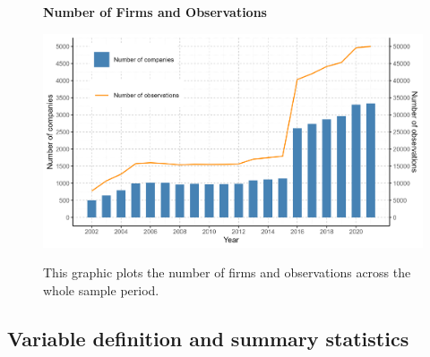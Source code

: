 \documentclass[12pt]{article}
\begin{document}
\begin{figure}[!ht]
\centering
\caption{\textbf{Number of Firms and Observations}}
\includegraphics{image/number_p.png}
\label{fig: num}
\caption*{\footnotesize{This graphic plots the number of firms and observations across the whole sample period.}}
\end{figure}

\subsection{Variable definition and summary statistics}
\end{document}
